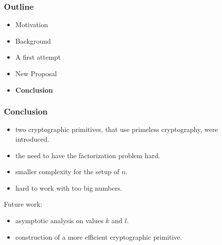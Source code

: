 \documentclass{beamer}
\begin{document}

\begin{frame}
\frametitle{Outline}

 	\begin{itemize}
		\item Motivation 
		\item Background
		\item A first attempt
		\item New Proposal
		\item \textbf{Conclusion}
	\end{itemize}
\end{frame}


\begin{frame}
\frametitle{Conclusion}

	\begin{itemize}
		\item two cryptographic primitives, that use primeless cryptography, were introduced.
		\item the need to have the factorization problem hard.
		\item smaller complexity for the setup of $n$.
		\item hard to work with too big numbers.		
	\end{itemize}
	
	\bigskip
	
	Future work:
	\begin{itemize}
		\item asymptotic analysis on values $k$ and $l$.
		\item construction of a more efficient cryptographic primitive.
	\end{itemize}

\end{frame}





\end{document}
